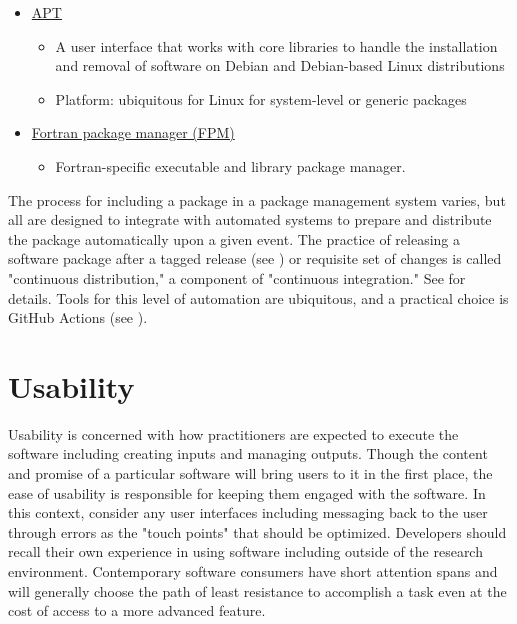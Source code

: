 \documentclass[]{nlr}
\begin{document}
\begin{itemize}
\item \href{https://en.wikipedia.org/wiki/APT\_(software)}{APT}
\begin{itemize}
\item A user interface that works with core libraries to handle the installation and removal of software on Debian and Debian-based Linux distributions
\item Platform: ubiquitous for Linux for system-level or generic packages
\end{itemize}

\item \href{https://fpm.fortran-lang.org/index.html}{Fortran package manager (FPM)}
\begin{itemize}
\item Fortran-specific executable and library package manager.
\end{itemize}

\end{itemize}

The process for including a package in a package management system varies, but all are designed
to integrate with automated systems to prepare and distribute the package automatically upon
a given event. The practice of releasing a software package after a tagged release
(see ) or requisite set of changes is called "continuous distribution,"
a component of "continuous integration." See  for details.
Tools for this level of automation are ubiquitous, and a practical choice
is GitHub Actions (see ).


\chapter{Usability}
\label{sec:usability}
Usability is concerned with how practitioners are expected to execute the software including
creating inputs and managing outputs.
Though the content and promise of a particular software will bring users to it in the first
place, the ease of usability is responsible for keeping them engaged with the software.
In this context, consider any user interfaces including messaging back to the user through
errors as the "touch points" that should be optimized.
Developers should recall their own experience in using software including outside
of the research environment.
Contemporary software consumers have short attention spans and will generally choose
the path of least resistance to accomplish a task even at the cost of access to a more
advanced feature.
\end{document}
